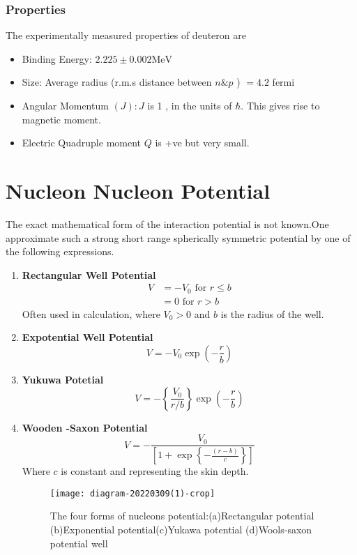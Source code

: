 \subsubsection{Properties}
The experimentally measured properties of deuteron are
\begin{itemize}
	\item Binding Energy: $2.225 \pm 0.002 \mathrm{MeV}$
	\item  Size: Average radius (r.m.s distance between $n \& p$ ) $=4.2$ fermi
	\item Angular Momentum $(J): J$ is 1 , in the units of $\hbar$. This gives rise to magnetic moment.
	\item Electric Quadruple moment $Q$ is +ve but very small.
\end{itemize}
\section{Nucleon Nucleon Potential}
The exact mathematical form of the interaction potential is not known.One approximate such a strong short range spherically symmetric potential by one of the following expressions.
\begin{enumerate}
	\item \textbf{Rectangular Well Potential}\\
	\begin{align*}
		V &=-V_{0} \text { for } r \leq b \\
		&=0 \text { for } r>b
	\end{align*}
	Often used in calculation, where $V_{0}>0$ and $b$ is the radius of the well.
	\item \textbf{Expotential Well Potential}
	$$
	V=-V_{0} \exp \left(-\frac{r}{b}\right)
	$$
	\item \textbf{Yukuwa Potetial}
	$$
	V=-\left\{\frac{V_{0}}{r / b}\right\} \exp \left(-\frac{r}{b}\right)
	$$
	\item \textbf{Wooden -Saxon Potential}
	$$
	V=-\frac{V_{0}}{\left[1+\exp \left\{-\frac{(r-b)}{c}\right\}\right]}
	$$
	Where $c$ is constant and representing the skin depth.
	\begin{figure}[H]
		\centering
		\texttt{[image: diagram-20220309(1)-crop]}
		\caption{The four forms of nucleons potential:(a)Rectangular potential (b)Exponential potential(c)Yukawa potential (d)Wools-saxon potential well}
		\label{}
	\end{figure}
\end{enumerate}
